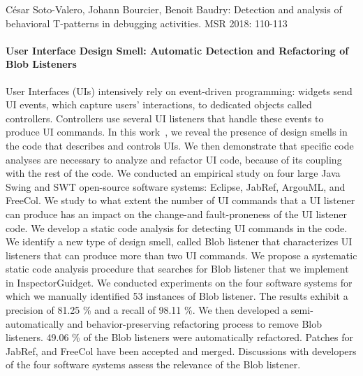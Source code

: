 César Soto-Valero, Johann Bourcier, Benoit Baudry:
Detection and analysis of behavioral T-patterns in debugging activities. MSR 2018: 110-113



\paragraph{User Interface Design Smell: Automatic Detection and Refactoring of Blob Listeners}

User Interfaces (UIs) intensively rely on event-driven programming: widgets send UI events, which capture users' interactions, to dedicated objects called controllers. Controllers use several UI listeners that handle these events to produce UI commands. In this work~\cite{blouin:hal-01499106}, we reveal the presence of design smells in the code that describes and controls UIs. We then demonstrate that specific code analyses are necessary to analyze and refactor UI code, because of its coupling with the rest of the code. We conducted an empirical study on four large Java Swing and SWT open-source software systems: Eclipse, JabRef, ArgouML, and FreeCol. We study to what extent the number of UI commands that a UI listener can produce has an impact on the change-and fault-proneness of the UI listener code. We develop a static code analysis for detecting UI commands in the code. We identify a new type of design smell, called Blob listener that characterizes UI listeners that can produce more than two UI commands. We propose a systematic static code analysis procedure that searches for Blob listener that we implement in InspectorGuidget. We conducted experiments on the four software systems for which we manually identified 53 instances of Blob listener. The results exhibit a precision of 81.25 \% and a recall of 98.11 \%. We then developed a semi-automatically and behavior-preserving refactoring process to remove Blob listeners. 49.06 \% of the Blob listeners were automatically refactored. Patches for JabRef, and FreeCol have been accepted and merged. Discussions with developers of the four software systems assess the relevance of the Blob listener.





